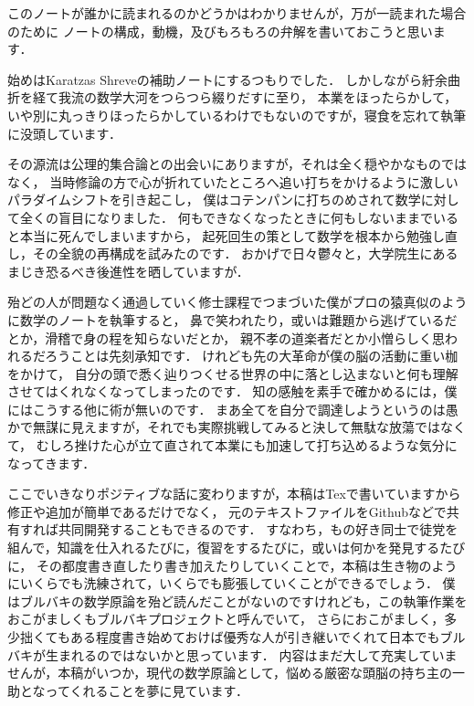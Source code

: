 
このノートが誰かに読まれるのかどうかはわかりませんが，万が一読まれた場合のために
ノートの構成，動機，及びもろもろの弁解を書いておこうと思います．

始めはKaratzas Shreveの補助ノートにするつもりでした．
しかしながら紆余曲折を経て我流の数学大河をつらつら綴りだすに至り，
本業をほったらかして，いや別に丸っきりほったらかしているわけでもないのですが，寝食を忘れて執筆に没頭しています．

その源流は公理的集合論との出会いにありますが，それは全く穏やかなものではなく，
当時修論の方で心が折れていたところへ追い打ちをかけるように激しいパラダイムシフトを引き起こし，
僕はコテンパンに打ちのめされて数学に対して全くの盲目になりました．
何もできなくなったときに何もしないままでいると本当に死んでしまいますから，
起死回生の策として数学を根本から勉強し直し，その全貌の再構成を試みたのです．
おかげで日々鬱々と，大学院生にあるまじき恐るべき後進性を晒していますが．

殆どの人が問題なく通過していく修士課程でつまづいた僕がプロの猿真似のように数学のノートを執筆すると，
鼻で笑われたり，或いは難題から逃げているだとか，滑稽で身の程を知らないだとか，
親不孝の道楽者だとか小憎らしく思われるだろうことは先刻承知です．
けれども先の大革命が僕の脳の活動に重い枷をかけて，
自分の頭で悉く辿りつくせる世界の中に落とし込まないと何も理解させてはくれなくなってしまったのです．
知の感触を素手で確かめるには，僕にはこうする他に術が無いのです．
まあ全てを自分で調達しようというのは愚かで無謀に見えますが，それでも実際挑戦してみると決して無駄な放蕩ではなくて，
むしろ挫けた心が立て直されて本業にも加速して打ち込めるような気分になってきます．

ここでいきなりポジティブな話に変わりますが，本稿はTexで書いていますから修正や追加が簡単であるだけでなく，
元のテキストファイルをGithubなどで共有すれば共同開発することもできるのです．
すなわち，もの好き同士で徒党を組んで，知識を仕入れるたびに，復習をするたびに，或いは何かを発見するたびに，
その都度書き直したり書き加えたりしていくことで，本稿は生き物のようにいくらでも洗練されて，いくらでも膨張していくことができるでしょう．
僕はブルバキの数学原論を殆ど読んだことがないのですけれども，この執筆作業をおこがましくもブルバキプロジェクトと呼んでいて，
さらにおこがましく，多少拙くてもある程度書き始めておけば優秀な人が引き継いでくれて日本でもブルバキが生まれるのではないかと思っています．
内容はまだ大して充実していませんが，本稿がいつか，現代の数学原論として，悩める厳密な頭脳の持ち主の一助となってくれることを夢に見ています．

